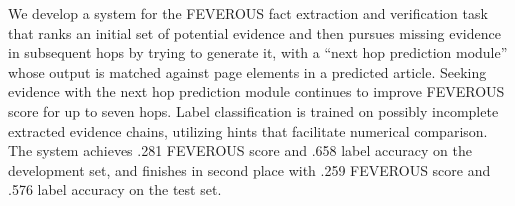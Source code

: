 We develop a system for the FEVEROUS fact extraction and verification task that ranks an initial set of potential evidence and then pursues missing evidence in subsequent hops by trying to generate it, with a ``next hop prediction module'' whose output is matched against page elements in a predicted article.  Seeking evidence with the next hop prediction module continues to improve FEVEROUS score for up to seven hops.  Label classification is trained on possibly incomplete extracted evidence chains, utilizing hints that facilitate numerical comparison.  The system achieves .281 FEVEROUS score and .658 label accuracy on the development set, and finishes in second place with .259 FEVEROUS score and .576 label accuracy on the test set.
